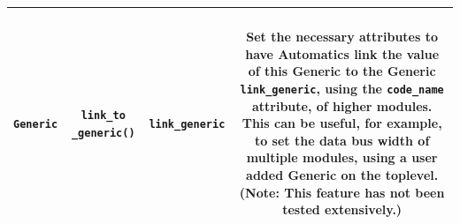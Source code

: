 \begin{longtable}[htbp]{|c|c|c|c|}
\parbox{2.5cm}{~\\ \texttt{Generic}\\~} & \parbox{3cm}{~\\ \texttt{link\_to \_generic()}\\~} & \parbox{3cm}{~ \\ \texttt{link\_generic} \\ ~} & \parbox{6cm}{~\\ Set the necessary attributes to have Automatics link the value of this Generic to the Generic \texttt{link\_generic}, using the \texttt{code\_name} attribute, of higher modules. This can be useful, for example, to set the data bus width of multiple modules, using a user added Generic on the toplevel. (Note: This feature has not been tested extensively.) \\~}\\
\hline



\end{longtable}
